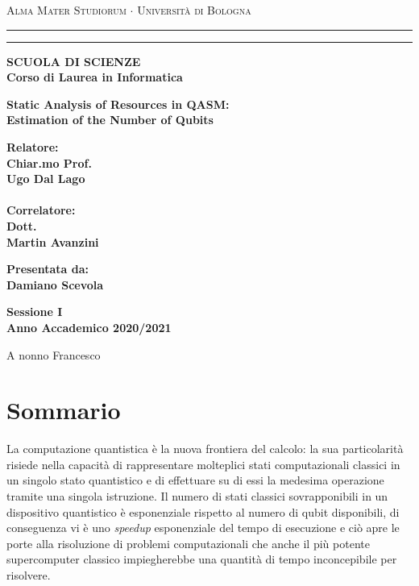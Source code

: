 \documentclass[12pt,a4paper]{report}
\theoremstyle{definition}
\theoremstyle{definition}
\theoremstyle{definition}
\newenvironment{dedication}
{%
\thispagestyle{empty}%
\vspace*{\stretch{1}}%
\itshape             %
\raggedleft          %
}
{\par %
\vspace{\stretch{3}} %
\clearpage           %
}
\begin{document}
\begin{titlepage}
\begin{center}
{{\Large{\textsc{Alma Mater Studiorum $\cdot$ Universit\`a di
Bologna}}}} \rule[0.1cm]{15.8cm}{0.1mm}
\rule[0.5cm]{15.8cm}{0.6mm}
{\small{\bf SCUOLA DI SCIENZE\\
Corso di Laurea in Informatica }}
\end{center}
\vspace{15mm}
\begin{center}
{\LARGE{\bf Static Analysis of Resources in QASM:}}\\
\vspace{3mm}
{\LARGE{\bf Estimation of the Number of Qubits}}\\
\end{center}
\vspace{40mm}
\par
\noindent
\begin{minipage}[t]{0.47\textwidth}
{\large{\bf Relatore:\\
Chiar.mo Prof.\\
Ugo Dal Lago\\
\\
Correlatore:\\
Dott.\\
Martin Avanzini\\
}}
\end{minipage}
\hfill
\begin{minipage}[t]{0.47\textwidth}\raggedleft
{\large{\bf Presentata da:\\
Damiano Scevola}}
\end{minipage}
\vspace{20mm}
\begin{center}
{\large{\bf Sessione I\\%
Anno Accademico 2020/2021}}%
\end{center}
\end{titlepage}

\begin{dedication}
A nonno Francesco
\end{dedication}

\chapter*{Sommario}
La computazione quantistica è la nuova frontiera del calcolo: la sua particolarità risiede nella capacità di rappresentare molteplici stati computazionali classici in un singolo stato quantistico e di effettuare su di essi la medesima operazione tramite una singola istruzione. Il numero di stati classici sovrapponibili in un dispositivo quantistico è esponenziale rispetto al numero di qubit disponibili, di conseguenza vi è uno \emph{speedup} esponenziale del tempo di esecuzione e ciò apre le porte alla risoluzione di problemi computazionali che anche il più potente supercomputer classico impiegherebbe una quantità di tempo inconcepibile per risolvere. 
\end{document}

